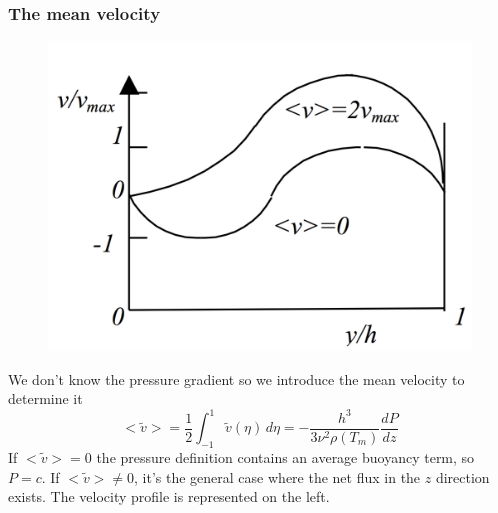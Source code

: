 		\subsubsection{The mean velocity}
			\begin{figure}
			\vspace{-5 mm}
			\includegraphics[scale=0.15]{ch5/13}
			\end{figure}		
		We don't know the pressure gradient so we introduce the mean velocity to determine it
			\begin{equation}
				<\tilde{v}> = \frac{1}{2} \int _{-1} ^1 \tilde{v} (\eta) \, d\eta = - \frac{h^3}{3\nu ^2\rho (T_m)} \frac{dP}{dz} 
			\end{equation}
			If $<\tilde{v}> = 0$ the pressure definition contains an average buoyancy term, so $P = c$. If $<\tilde{v}> \neq 0$, it's the general case where the net flux in the $z$ direction exists. The velocity profile is represented on the left.
		
